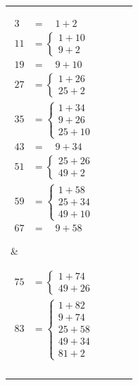 \documentclass[12pt]{article}
\begin{document}
\begin{tabular}{l|l|l|l} 
\parbox[t]{0.2\linewidth}{%
  \vspace*{-\baselineskip}
    \begin{align*} 
        3 &= \quad \! 1 + 2 \\ 
        11 &= \begin{cases}
          1 + 10 \\ 9 + 2
        \end{cases} \\
        19 &= \quad \! 9 + 10 \\
        27 &= \begin{cases}
          1 + 26 \\ 25 + 2
        \end{cases} \\
        35 &= \begin{cases}
          1 + 34 \\ 9 + 26 \\ 25 + 10
        \end{cases} \\
        43 &= \quad \! 9+34 \\
        51 &= \begin{cases}
          25 + 26 \\ 49 + 2
        \end{cases} \\
        59 &= \begin{cases}
          1 + 58 \\ 25 + 34 \\ 49 + 10
        \end{cases} \\
        67 &= \quad \! 9 + 58
    \end{align*}} &  
\parbox[t]{0.2\linewidth}{%
  \vspace*{-\baselineskip}
    \begin{align*} 
        75 &= \begin{cases}
          1 + 74 \\ 49 + 26
        \end{cases} \\
        83 &= \begin{cases}
          1 + 82 \\ 9 + 74 \\ 25 + 58 \\ 49 + 34 \\ 81 + 2
        \end{cases} \\

\end{align*}}
\end{tabular}
\end{document}

